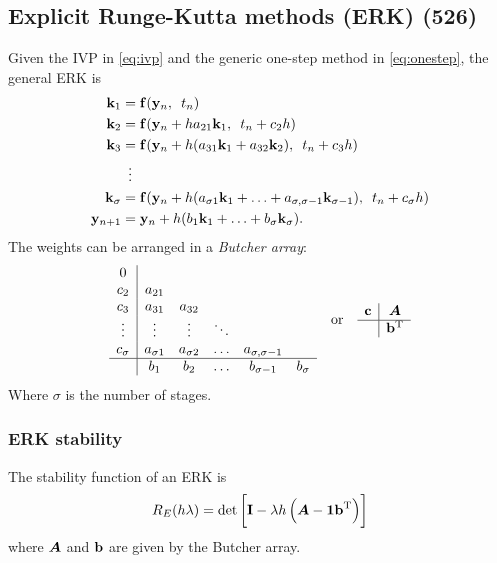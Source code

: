 \documentclass[a4paper, 12pt]{article}
\begin{document}
\subsection{Explicit Runge-Kutta methods (ERK) (526)}
Given the IVP in \eqref{eq:ivp} and the generic one-step method in \eqref{eq:onestep}, the general ERK is
\begin{equation}
	\begin{aligned}
		\mathbf{k}_1 &= \mathbf{f}(\mathbf{y}_n, \enspace t_n) \\
		\mathbf{k}_2 &= \mathbf{f}(\mathbf{y}_n + h a_{21}\mathbf{k}_1, \enspace t_n + c_2 h) \\
		\mathbf{k}_3 &= \mathbf{f}(\mathbf{y}_n + h (a_{31}\mathbf{k}_1 + a_{32} \mathbf{k}_2), \enspace t_n + c_3 h) \\
				& \enspace \vdots \\
		\mathbf{k}_\sigma &= \mathbf{f}(\mathbf{y}_n + h (a_{\sigma 1}\mathbf{k}_1 + \hdots + a_{\sigma,\sigma-1}\mathbf{k}_{\sigma-1}), \enspace t_n + c_\sigma h) \\
		\mathbf{y}_{n+1} &= \mathbf{y}_n + h (b_1 \mathbf{k}_1 + \hdots + b_\sigma \mathbf{k}_\sigma).
	\end{aligned}
\end{equation}
The weights can be arranged in a \emph{Butcher array}:
\begin{equation}
\begin{array}{c|ccccc}
0        &              &              &        &                      &          \\
c_2      & a_{21}       &              &        &                      &          \\
c_3      & a_{31}       & a_{32}       &        &                      &          \\
\vdots   & \vdots       & \vdots       & \ddots &                      &          \\
c_\sigma & a_{\sigma 1} & a_{\sigma 2} & \hdots & a_{\sigma, \sigma-1} &          \\ \hline
         & b_1          & b_2          & \hdots & b_{\sigma-1}         & b_\sigma \\
\end{array}
\quad \text{or} \quad
\begin{array}{c|c}
    \mathbf{c} & \bm{A}   \\ \hline
          & \mathbf{b}^{\text{T}} \\
\end{array}
\end{equation}
Where \( \sigma \) is the number of stages.

\subsubsection{ERK stability}
The stability function of an ERK is
\begin{equation}
	R_E(h\lambda) = \det \left[ \mathbf{I} -\lambda h \left( \bm{A} - \mathbf{1 b}^{\text{T}} \right) \right]
\end{equation}
where \(\bm{A}\) and \(\mathbf{b}\) are given by the Butcher array.
\end{document}
